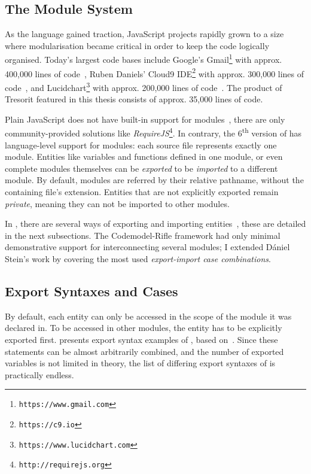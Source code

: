 \subsection{The \es Module System}

As the language gained traction, JavaScript projects rapidly grown to a size where modularisation became critical in order to keep the code logically organised. Today's largest \es code bases include Google's Gmail\footnote{\texttt{https://www.gmail.com}} with approx. 400,000 lines of code~\cite{gmail-loc}, Ruben Daniels' Cloud9 IDE\footnote{\texttt{https://c9.io}} with approx. 300,000 lines of code~\cite{cloud9-loc}, and Lucidchart\footnote{\texttt{https://www.lucidchart.com}} with approx. 200,000 lines of code~\cite{lucidchart-loc}. The product of Tresorit featured in this thesis consists of approx. 35,000 lines of \es code.

Plain JavaScript does not have built-in support for modules~\cite{exploringes6}, there are only community-provided solutions like \emph{RequireJS}\footnote{\texttt{http://requirejs.org}}. In contrary, the 6\textsuperscript{th} version of \es has language-level support for modules: each source file represents exactly one module. Entities like variables and functions defined in one module, or even complete modules themselves can be \emph{exported} to be \emph{imported} to a different module. By default, modules are referred by their relative pathname, without the containing file's extension. Entities that are not explicitly exported remain \emph{private}, meaning they can not be imported to other modules.

In , there are several ways of exporting and importing entities~\cite{exploringes6}, these are detailed in the next subsections. The Codemodel-Rifle framework had only minimal demonstrative support for interconnecting several \es modules; I extended Dániel Stein's work by covering the most used \emph{export-import case combinations}.


\subsection{Export Syntaxes and Cases}

By default, each entity can only be accessed in the scope of the module it was declared in. To be accessed in other modules, the entity has to be explicitly exported first.  presents export syntax examples of , based on~\cite{export-syntaxes}. Since these statements can be almost arbitrarily combined, and the number of exported variables is not limited in theory, the list of differing export syntaxes of  is practically endless.

